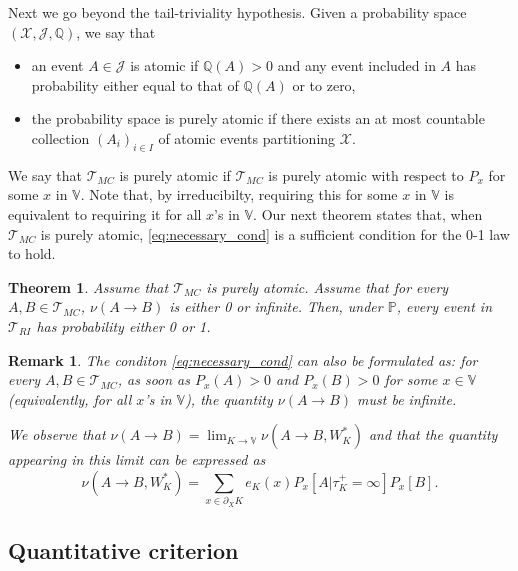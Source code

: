 \documentclass[12pt,a4paper]{article}
\newtheorem{theorem}[theo]{Theorem}
\newtheorem{remark}[theo]{Remark}
\newcommand{\1}[1]{{\mathbf 1}{\{#1\}}}
\newcommand{\bbP}{\mathbb{P}}
\newcommand{\8}{{\infty}}
\begin{document}
Next we go beyond the tail-triviality hypothesis. 
Given a probability space $(\mathcal{X}, \mathcal{J}, \mathbb{Q})$, we say that 
\begin{itemize}
\item an event $A\in \mathcal{J}$ is  atomic if $\mathbb{Q}(A)>0$ and any event included in $A$ has probability either equal to that of $\mathbb{Q}(A)$ or to zero,
\item the probability space is purely atomic if there exists an at most countable collection $(A_i)_{i\in I}$ of atomic events partitioning $\mathcal{X}$.
\end{itemize}
We say that $\mathcal{T}_{MC}$ is purely atomic if $\mathcal{T}_{MC}$ is purely atomic with respect to $P_x$ for some $x$ in $\mathbb{V}$.  Note that, by irreducibilty, requiring this for some $x$ in $\mathbb{V}$ is equivalent to requiring it for all $x$'s in $\mathbb{V}$. 
Our next theorem states that, when $\mathcal{T}_{MC}$ is purely atomic, \eqref{eq:necessary_cond} is a sufficient condition for the 0-1 law to hold.
\begin{theorem}\label{th:tail_atomicity}
Assume that $\mathcal{T}_{MC}$ is purely atomic. 
Assume that for every $A, B\in\mathcal{T}_{MC}$, $\nu(A\rightarrow B)$ is either 0 or infinite. 
Then, under $\bbP$, every event in $\mathcal{T}_{RI}$ has probability either 0 or 1.
\end{theorem}


\begin{remark}
  The conditon \eqref{eq:necessary_cond} can also be formulated as: for every $A, B\in \mathcal{T}_{MC}$, as soon as $P_x(A)>0$ and $P_x(B)>0$ for some $x\in \mathbb{V}$ (equivalently, for all $x$'s in $\mathbb{V}$), the quantity $\nu(A\to B)$ must be infinite.

We observe that
$\nu(A\rightarrow B)=\lim_{K\to \mathbb{V}} \nu(A\rightarrow B, W_K^*)$ and that the quantity appearing in this limit can be expressed as
\begin{equation}
\nu(A\rightarrow B, W_K^*)=\sum_{x\in \partial_X K} e_K(x) P_x[ A | \tau_K^+=\infty] P_x[B].
\end{equation}
\end{remark}

\subsection{Quantitative criterion}
\end{document}
